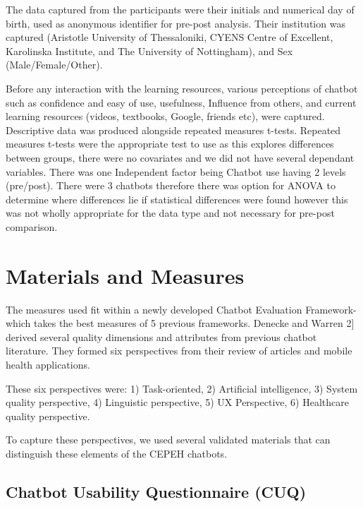 \documentclass[a4paper, nobind]{templates/ociamthesis}
\begin{document}
The data captured from the participants were their initials and numerical day of birth, used as anonymous identifier for pre-post analysis. Their institution was captured (Aristotle University of Thessaloniki, CYENS Centre of Excellent, Karolinska Institute, and The University of Nottingham), and Sex (Male/Female/Other).

Before any interaction with the learning resources, various perceptions of chatbot such as confidence and easy of use, usefulness, Influence from others, and current learning resources (videos, textbooks, Google, friends etc), were captured. Descriptive data was produced alongside repeated measures t-tests. Repeated measures t-tests were the appropriate test to use as this explores differences between groups, there were no covariates and we did not have several dependant variables. There was one Independent factor being Chatbot use having 2 levels (pre/post). There were 3 chatbots therefore there was option for ANOVA to determine where differences lie if statistical differences were found however this was not wholly appropriate for the data type and not necessary for pre-post comparison.

\hypertarget{materials-and-measures}{%
\section{Materials and Measures}\label{materials-and-measures}}

The measures used fit within a newly developed Chatbot Evaluation Framework- which takes the best measures of 5 previous frameworks. Denecke and Warren \hspace{0pt}{[}2{]}\hspace{0pt} derived several quality dimensions and attributes from previous chatbot literature. They formed six perspectives from their review of articles and mobile health applications.

These six perspectives were: 1) Task-oriented, 2) Artificial intelligence, 3) System quality perspective, 4) Linguistic perspective, 5) UX Perspective, 6) Healthcare quality perspective.

To capture these perspectives, we used several validated materials that can distinguish these elements of the CEPEH chatbots.

\hypertarget{chatbot-usability-questionnaire-cuq}{%
\subsection{Chatbot Usability Questionnaire (CUQ)}\label{chatbot-usability-questionnaire-cuq}}
\end{document}
